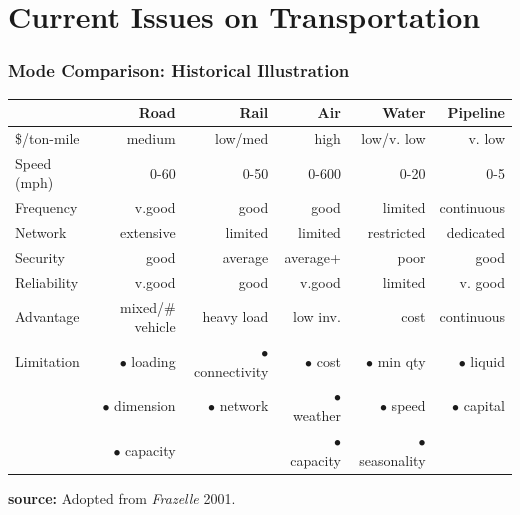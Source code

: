 \documentclass[10pt,presentation]{beamer}
\begin{document}
\section[Issue]{Current Issues on Transportation}
\begin{frame}
  \frametitle{Mode Comparison: Historical Illustration}

  \begin{center}
  \footnotesize{
  \begin{tabular}{lrrrrr} \hline
                   & Road                 & Rail        & Air         & Water           & Pipeline        \\  \hline
    \$/ton-mile    & medium               & low/med     & high        & \alert{low/v. low}      & v. low  \\
    Speed (mph)    & 0-60                 & 0-50        & \alert{0-600}& 0-20           & 0-5 \\
    Frequency      & \alert{v.good}               & good        & good        & limited         & \alert{continuous} \\
    Network        & \alert{extensive}    & limited     & limited     & \alert{restricted}      & dedicated \\
    Security       & good                 & average     & average+    & poor          & good \\
    Reliability    & v.good               & good        & \alert{v.good}      & limited     & v. good \\
    Advantage      & mixed/\# vehicle     & heavy load  & low inv.    & cost    & continuous \\
    Limitation     & $\bullet$ loading    & $\bullet$ connectivity    & $\bullet$ cost     & $\bullet$ min qty    & $\bullet$ liquid\\
                   & $\bullet$ dimension  & $\bullet$ network         & $\bullet$ weather  & $\bullet$ speed      & $\bullet$ capital \\
                   & $\bullet$ capacity   &                           & $\bullet$ capacity & $\bullet$ seasonality&   \\ \hline
  \end{tabular}
  }
  \end{center}

  \begin{flushright}
    \tiny{\textbf{source:} Adopted from \textsl{Frazelle} 2001. }
  \end{flushright}


\end{frame}
\end{document}
